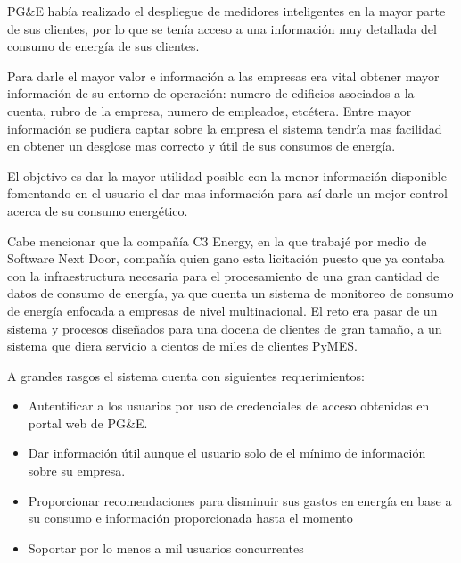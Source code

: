 \documentclass{article}
\begin{document}
PG\&E había realizado el despliegue de medidores inteligentes en la
mayor parte de sus clientes, por lo que se tenía acceso a una información
muy detallada del consumo de energía de sus clientes.

Para darle el mayor valor e información a las empresas era
vital obtener mayor información de su entorno de operación: numero
de edificios asociados a la cuenta, rubro de la empresa, numero de
empleados, etcétera. Entre mayor información se pudiera captar sobre la
empresa el sistema tendría mas facilidad en obtener un desglose
mas correcto y útil de sus consumos de energía.

El objetivo es dar la mayor utilidad posible con la menor
información disponible fomentando en el usuario el dar mas
información para así darle un mejor control acerca de su consumo energético.

Cabe mencionar que la compañía C3 Energy, en la que trabajé
por medio de Software Next Door, compañía quien gano esta licitación puesto
que ya contaba con la infraestructura necesaria para el procesamiento
de una gran cantidad de datos de consumo de energía, ya que cuenta un sistema
de monitoreo de consumo de energía enfocada a empresas de nivel
multinacional. El reto era pasar de un sistema y procesos diseñados
para una docena de clientes de gran tamaño, a un sistema que diera
servicio a cientos de miles de clientes PyMES.

A grandes rasgos el sistema cuenta con siguientes requerimientos:
\begin{itemize}
\item Autentificar a los usuarios por uso de credenciales de acceso
  obtenidas en portal web de PG\&E.
\item Dar información útil aunque el usuario solo de
  el mínimo de información sobre su empresa.
\item Proporcionar recomendaciones para disminuir sus
  gastos en energía en base a su consumo e información proporcionada
  hasta el momento
\item Soportar por lo menos a mil usuarios concurrentes
\end{itemize}
\end{document}
